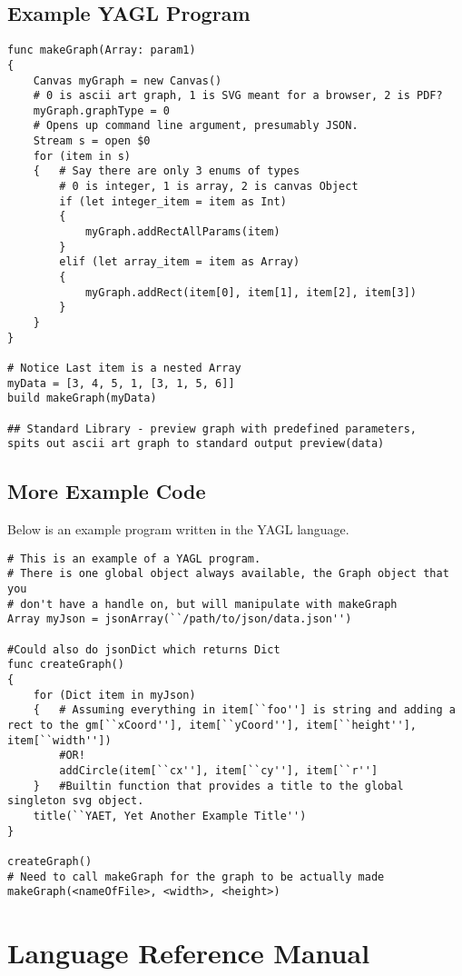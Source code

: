 \documentclass[12pt]{article}
\begin{document}
\subsection{Example YAGL Program}
\begin{lstlisting}
func makeGraph(Array: param1)
{
	Canvas myGraph = new Canvas()
	# 0 is ascii art graph, 1 is SVG meant for a browser, 2 is PDF?
	myGraph.graphType = 0
	# Opens up command line argument, presumably JSON.
	Stream s = open $0
	for (item in s)
	{	# Say there are only 3 enums of types
		# 0 is integer, 1 is array, 2 is canvas Object
		if (let integer_item = item as Int)
		{
			myGraph.addRectAllParams(item)
		}
		elif (let array_item = item as Array)
		{
			myGraph.addRect(item[0], item[1], item[2], item[3])
		}
	}
}

# Notice Last item is a nested Array 
myData = [3, 4, 5, 1, [3, 1, 5, 6]]
build makeGraph(myData)

## Standard Library - preview graph with predefined parameters, 
spits out ascii art graph to standard output preview(data)
\end{lstlisting}

\subsection{More Example Code}
Below is an example program written in the YAGL language.

\begin{lstlisting}
# This is an example of a YAGL program. 
# There is one global object always available, the Graph object that you 
# don't have a handle on, but will manipulate with makeGraph
Array myJson = jsonArray(``/path/to/json/data.json'')

#Could also do jsonDict which returns Dict 
func createGraph()
{
    for (Dict item in myJson)
    {   # Assuming everything in item[``foo''] is string and adding a rect to the gm[``xCoord''], item[``yCoord''], item[``height''], item[``width''])
        #OR!
        addCircle(item[``cx''], item[``cy''], item[``r'']
    }   #Builtin function that provides a title to the global singleton svg object. 
    title(``YAET, Yet Another Example Title'')
}

createGraph()
# Need to call makeGraph for the graph to be actually made
makeGraph(<nameOfFile>, <width>, <height>)

\end{lstlisting}

\section{Language Reference Manual}
\end{document}
